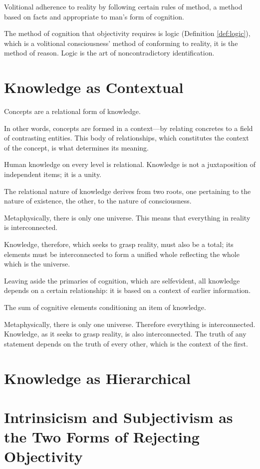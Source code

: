             \begin{definition}[Obectivity]
            \label{def:objectivity}
                Volitional adherence to reality by following certain rules of method, a method based on facts and appropriate to man's form of cognition.
            \end{definition}

        The method of cognition that objectivity requires is logic (Definition \ref{def:logic}), which is a volitional consciousness' method of conforming to reality, it is the method of reason. Logic is the art of noncontradictory identification.

    \section{Knowledge as Contextual}

        Concepts are a relational form of knowledge.

        In other words, concepts are formed in a context—by relating concretes to a field of contrasting entities. This body of relationships, which constitutes the context of the concept, is what determines its meaning.

        Human knowledge on every level is relational. Knowledge
        is not a juxtaposition of independent items; it is a unity.

        The relational nature of knowledge derives from two roots, one pertaining to the nature of existence, the other, to the nature of consciousness.

        Metaphysically, there is only one universe. This means that everything in reality is interconnected.

        Knowledge, therefore, which seeks to grasp reality, must also be a total; its elements must be interconnected to form a unified whole reflecting the whole which is the universe.

        Leaving aside the primaries of cognition, which are selfevident, all knowledge depends on a certain relationship: it is based on a context of earlier information.

        \begin{definition}[Context]
            \label{def:context}
                The sum of cognitive elements conditioning an item of knowledge.
        \end{definition}


        \begin{theorem}
            \label{the:context}
                Metaphysically, there is only one universe. Therefore everything is interconnected. Knowledge, as it seeks to grasp reality, is also interconnected. The truth of any statement depends on the truth of every other, which is the context of the first.
        \end{theorem}

    \section{Knowledge as Hierarchical}

    \section{Intrinsicism and Subjectivism as the Two Forms of Rejecting Objectivity}




